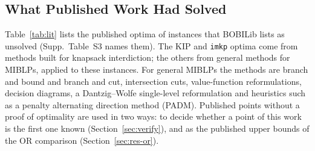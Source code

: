 \documentclass[]{spie}  %
\theoremstyle{plain}
\newcommand{\code}[1]{\texttt{#1}}
\begin{document}
\subsection{What Published Work Had Solved}\label{sec:literature}

Table~\ref{tab:lit} lists the published optima of instances that BOBILib lists as unsolved
(Supp.\ Table~S3 names them). The KIP and \code{imkp} optima come from methods built for
knapsack interdiction; the others from general methods for MIBLPs, applied to these instances. For general MIBLPs
the methods are branch and bound\cite{moore1990mixed} and branch and
cut,\cite{denegre2009branch,tahernejad2020mibs} intersection
cuts,\cite{fischetti2016intersection,fischetti2018intersection,fischetti2017new} value-function
reformulations,\cite{mitsos2010global,lozano2017value} decision
diagrams,\cite{lozano2026network,vasquez2025single} a Dantzig--Wolfe single-level
reformulation\cite{lefebvre2025dantzig} and heuristics such as a penalty alternating direction
method (PADM).\cite{kleinert2021computing} Published points without a proof of optimality are
used in two ways: to decide whether a point of this work is the first one known
(Section~\ref{sec:verify}), and as the published upper bounds of the OR comparison
(Section~\ref{sec:res-or}).
\end{document}
